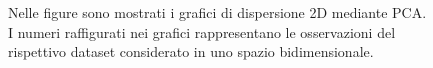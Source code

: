 \documentclass[12pt,italian]{report}
\begin{document}
\begin{figure}
	\centering
	\caption{Nelle figure sono mostrati i grafici di dispersione 2D mediante PCA. I numeri raffigurati nei grafici rappresentano le osservazioni del rispettivo dataset considerato in uno spazio bidimensionale.}
	\label{fig:pca_2d}
\end{figure}
\end{document}
